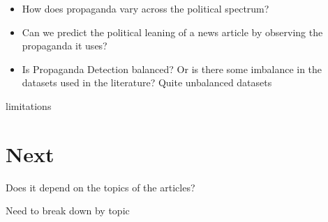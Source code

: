 \begin{itemize}
    \item How does propaganda vary across the political spectrum?
    \item Can we predict the political leaning of a news article by observing the propaganda it uses?
    \item Is Propaganda Detection balanced? Or is there some imbalance in the datasets used in the literature? Quite unbalanced datasets
\end{itemize}

limitations

\section{Next}
\label{sec:ps_next}

Does it depend on the topics of the articles?

Need to break down by topic